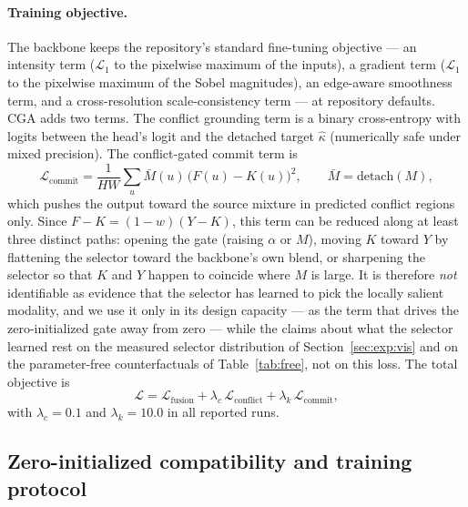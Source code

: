 \documentclass[pdflatex,sn-mathphys-num]{sn-jnl}
\theoremstyle{thmstyleone}%
\theoremstyle{thmstyletwo}%
\theoremstyle{thmstylethree}%
\begin{document}
\paragraph{Training objective.}
The backbone keeps the repository's standard fine-tuning objective --- an intensity term ($\mathcal{L}_1$ to the pixelwise maximum of the inputs), a gradient term ($\mathcal{L}_1$ to the pixelwise maximum of the Sobel magnitudes), an edge-aware smoothness term, and a cross-resolution scale-consistency term --- at repository defaults. CGA adds two terms. The conflict grounding term is a binary cross-entropy with logits between the head's logit and the detached target $\hat\kappa$ (numerically safe under mixed precision). The conflict-gated commit term is
\begin{equation}\label{eq:commitloss}
\mathcal{L}_{\mathrm{commit}} = \frac{1}{HW}\sum_{u} \bar{M}(u)\,\big(F(u) - K(u)\big)^2, \qquad \bar{M} = \mathrm{detach}(M),
\end{equation}
which pushes the output toward the source mixture in predicted conflict regions only. Since $F - K = (1 - w)(Y - K)$, this term can be reduced along at least three distinct paths: opening the gate (raising $\alpha$ or $M$), moving $K$ toward $Y$ by flattening the selector toward the backbone's own blend, or sharpening the selector so that $K$ and $Y$ happen to coincide where $M$ is large. It is therefore \emph{not} identifiable as evidence that the selector has learned to pick the locally salient modality, and we use it only in its design capacity --- as the term that drives the zero-initialized gate away from zero --- while the claims about what the selector learned rest on the measured selector distribution of Section~\ref{sec:exp:vis} and on the parameter-free counterfactuals of Table~\ref{tab:free}, not on this loss. The total objective is
\begin{equation}\label{eq:total}
\mathcal{L} = \mathcal{L}_{\mathrm{fusion}} + \lambda_c\, \mathcal{L}_{\mathrm{conflict}} + \lambda_k\, \mathcal{L}_{\mathrm{commit}},
\end{equation}
with $\lambda_c = 0.1$ and $\lambda_k = 10.0$ in all reported runs.

\subsection{Zero-initialized compatibility and training protocol}\label{sec:methods:training}
\end{document}

